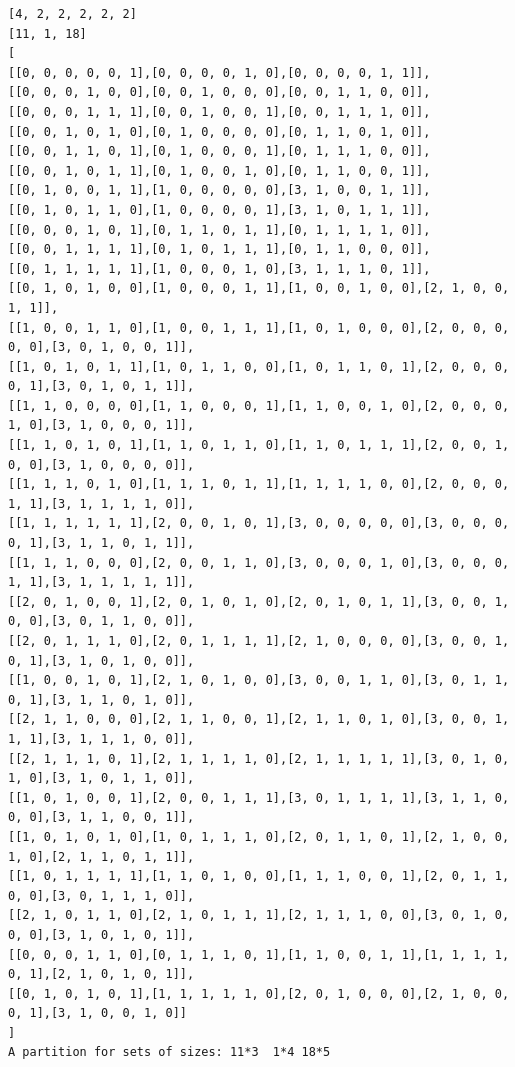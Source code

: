 \documentclass[final]{dmtcs-episciences}
\begin{document}
\begin{appendices}
\begin{verbatim} 
[4, 2, 2, 2, 2, 2]
[11, 1, 18]
[
[[0, 0, 0, 0, 0, 1],[0, 0, 0, 0, 1, 0],[0, 0, 0, 0, 1, 1]],
[[0, 0, 0, 1, 0, 0],[0, 0, 1, 0, 0, 0],[0, 0, 1, 1, 0, 0]],
[[0, 0, 0, 1, 1, 1],[0, 0, 1, 0, 0, 1],[0, 0, 1, 1, 1, 0]],
[[0, 0, 1, 0, 1, 0],[0, 1, 0, 0, 0, 0],[0, 1, 1, 0, 1, 0]],
[[0, 0, 1, 1, 0, 1],[0, 1, 0, 0, 0, 1],[0, 1, 1, 1, 0, 0]],
[[0, 0, 1, 0, 1, 1],[0, 1, 0, 0, 1, 0],[0, 1, 1, 0, 0, 1]],
[[0, 1, 0, 0, 1, 1],[1, 0, 0, 0, 0, 0],[3, 1, 0, 0, 1, 1]],
[[0, 1, 0, 1, 1, 0],[1, 0, 0, 0, 0, 1],[3, 1, 0, 1, 1, 1]],
[[0, 0, 0, 1, 0, 1],[0, 1, 1, 0, 1, 1],[0, 1, 1, 1, 1, 0]],
[[0, 0, 1, 1, 1, 1],[0, 1, 0, 1, 1, 1],[0, 1, 1, 0, 0, 0]],
[[0, 1, 1, 1, 1, 1],[1, 0, 0, 0, 1, 0],[3, 1, 1, 1, 0, 1]],
[[0, 1, 0, 1, 0, 0],[1, 0, 0, 0, 1, 1],[1, 0, 0, 1, 0, 0],[2, 1, 0, 0, 1, 1]],
[[1, 0, 0, 1, 1, 0],[1, 0, 0, 1, 1, 1],[1, 0, 1, 0, 0, 0],[2, 0, 0, 0, 0, 0],[3, 0, 1, 0, 0, 1]],
[[1, 0, 1, 0, 1, 1],[1, 0, 1, 1, 0, 0],[1, 0, 1, 1, 0, 1],[2, 0, 0, 0, 0, 1],[3, 0, 1, 0, 1, 1]],
[[1, 1, 0, 0, 0, 0],[1, 1, 0, 0, 0, 1],[1, 1, 0, 0, 1, 0],[2, 0, 0, 0, 1, 0],[3, 1, 0, 0, 0, 1]],
[[1, 1, 0, 1, 0, 1],[1, 1, 0, 1, 1, 0],[1, 1, 0, 1, 1, 1],[2, 0, 0, 1, 0, 0],[3, 1, 0, 0, 0, 0]],
[[1, 1, 1, 0, 1, 0],[1, 1, 1, 0, 1, 1],[1, 1, 1, 1, 0, 0],[2, 0, 0, 0, 1, 1],[3, 1, 1, 1, 1, 0]],
[[1, 1, 1, 1, 1, 1],[2, 0, 0, 1, 0, 1],[3, 0, 0, 0, 0, 0],[3, 0, 0, 0, 0, 1],[3, 1, 1, 0, 1, 1]],
[[1, 1, 1, 0, 0, 0],[2, 0, 0, 1, 1, 0],[3, 0, 0, 0, 1, 0],[3, 0, 0, 0, 1, 1],[3, 1, 1, 1, 1, 1]],
[[2, 0, 1, 0, 0, 1],[2, 0, 1, 0, 1, 0],[2, 0, 1, 0, 1, 1],[3, 0, 0, 1, 0, 0],[3, 0, 1, 1, 0, 0]],
[[2, 0, 1, 1, 1, 0],[2, 0, 1, 1, 1, 1],[2, 1, 0, 0, 0, 0],[3, 0, 0, 1, 0, 1],[3, 1, 0, 1, 0, 0]],
[[1, 0, 0, 1, 0, 1],[2, 1, 0, 1, 0, 0],[3, 0, 0, 1, 1, 0],[3, 0, 1, 1, 0, 1],[3, 1, 1, 0, 1, 0]],
[[2, 1, 1, 0, 0, 0],[2, 1, 1, 0, 0, 1],[2, 1, 1, 0, 1, 0],[3, 0, 0, 1, 1, 1],[3, 1, 1, 1, 0, 0]],
[[2, 1, 1, 1, 0, 1],[2, 1, 1, 1, 1, 0],[2, 1, 1, 1, 1, 1],[3, 0, 1, 0, 1, 0],[3, 1, 0, 1, 1, 0]],
[[1, 0, 1, 0, 0, 1],[2, 0, 0, 1, 1, 1],[3, 0, 1, 1, 1, 1],[3, 1, 1, 0, 0, 0],[3, 1, 1, 0, 0, 1]],
[[1, 0, 1, 0, 1, 0],[1, 0, 1, 1, 1, 0],[2, 0, 1, 1, 0, 1],[2, 1, 0, 0, 1, 0],[2, 1, 1, 0, 1, 1]],
[[1, 0, 1, 1, 1, 1],[1, 1, 0, 1, 0, 0],[1, 1, 1, 0, 0, 1],[2, 0, 1, 1, 0, 0],[3, 0, 1, 1, 1, 0]],
[[2, 1, 0, 1, 1, 0],[2, 1, 0, 1, 1, 1],[2, 1, 1, 1, 0, 0],[3, 0, 1, 0, 0, 0],[3, 1, 0, 1, 0, 1]],
[[0, 0, 0, 1, 1, 0],[0, 1, 1, 1, 0, 1],[1, 1, 0, 0, 1, 1],[1, 1, 1, 1, 0, 1],[2, 1, 0, 1, 0, 1]],
[[0, 1, 0, 1, 0, 1],[1, 1, 1, 1, 1, 0],[2, 0, 1, 0, 0, 0],[2, 1, 0, 0, 0, 1],[3, 1, 0, 0, 1, 0]]
]
A partition for sets of sizes: 11*3  1*4 18*5
\end{verbatim}
\newpage


\end{appendices}
\end{document}
